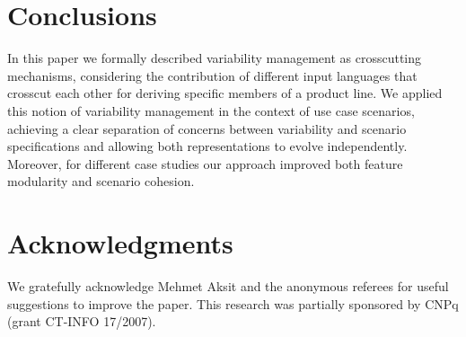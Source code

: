 \documentclass{sig-alt-full}
\begin{document}


\section{Conclusions}\label{sec:conclusions}

In this paper we formally described variability management as crosscutting
mechanisms, considering the contribution of different input languages that
crosscut each other for deriving specific members of a product line. We applied
this notion of variability management in the context of use case scenarios,
achieving a clear separation of
concerns between variability and scenario specifications and allowing both
representations to evolve independently. Moreover, for different case studies our approach improved both feature modularity and scenario cohesion. 





\section{Acknowledgments}
We gratefully acknowledge Mehmet Aksit and the anonymous referees
for useful suggestions to improve the paper. This research was partially
sponsored by CNPq (grant CT-INFO 17/2007). 

\end{document}
